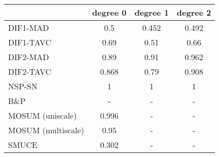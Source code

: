 \begin{tabular}{|l|c|c|c|}
  \hline
 & degree 0 & degree 1 & degree 2 \\ 
  \hline
DIF1-MAD & 0.5 & 0.452 & 0.492 \\ 
  DIF1-TAVC & 0.69 & 0.51 & 0.66 \\ 
  DIF2-MAD & 0.89 & 0.91 & 0.962 \\ 
  DIF2-TAVC & 0.868 & 0.79 & 0.908 \\ 
  NSP-SN & 1 & 1 & 1 \\ 
  B\&P & - & - & - \\ 
  MOSUM (uniscale) & 0.996 & - & - \\ 
  MOSUM (multiscale) & 0.95 & - & - \\ 
  SMUCE & 0.302 & - & - \\ 
   \hline
\end{tabular}
